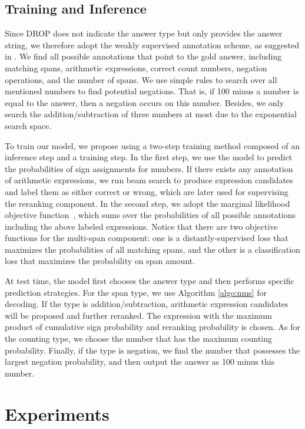 \documentclass[11pt,a4paper]{article}
\begin{document}
\subsection{Training and Inference	\label{sec:train-infer}}
Since DROP does not indicate the answer type but only provides the answer string, we therefore adopt the weakly supervised annotation scheme, as suggested in \citet{berant2013semantic,dua2019drop}. 
We find all possible annotations that point to the gold answer, including matching spans, arithmetic expressions, correct count numbers, negation operations, and the number of spans.
We use simple rules to search over all mentioned numbers to find potential negations. That is, if 100 minus a number is equal to the answer, then a negation occurs on this number.
Besides, we only search the addition/subtraction of three numbers at most due to the exponential search space.

To train our model, we propose using a two-step training method composed of an inference step and a training step.
In the first step, we use the model to predict the probabilities of sign assignments for numbers. 
If there exists any annotation of arithmetic expressions, we run beam search to produce expression candidates and label them as either correct or wrong, which are later used for supervising the reranking component.
In the second step, we adopt the marginal likelihood objective function~\cite{clark2017simple}, which sums over the probabilities of all possible annotations including the above labeled expressions.
Notice that there are two objective functions for the multi-span component: one is a distantly-supervised loss that maximizes the probabilities of all matching spans, and the other is a classification loss that maximizes the probability on span amount.

At test time, the model first chooses the answer type and then performs specific prediction strategies. 
For the span type, we use Algorithm \ref{algo:nms} for decoding.
If the type is addition/subtraction, arithmetic expression candidates will be proposed and further reranked.
The expression with the maximum product of cumulative sign probability and reranking probability is chosen.
As for the counting type, we choose the number that has the maximum counting probability.
Finally, if the type is negation, we find the number that possesses the largest negation probability, and then output the answer as 100 minus this number.
 \section{Experiments}
\end{document}
